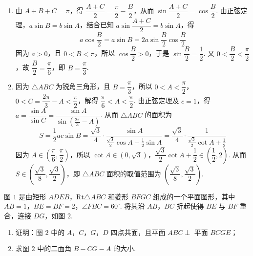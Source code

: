 \begin{solution}
\begin{enumerate}
\item 由 \(A+B+C=\pi\)，得 \(\dfrac{A+C}{2}=\dfrac\pi2-\dfrac B2\)，从而 \(\sin\dfrac{A+C}{2}=\cos\dfrac B2\). 由正弦定理，\(a\sin B=b\sin A\)，结合已知 \(a\sin\dfrac{A+C}{2}=b\sin A\)，得
\[
a\cos\frac B2=a\sin B=2a\sin\frac B2\cos\frac B2
\]
因为 \(a>0\)，且 \(0<B<\pi\)，所以 \(\cos\dfrac B2>0\)，于是 \(\sin\dfrac B2=\dfrac12\). 又 \(0<\dfrac B2<\dfrac\pi2\)，故 \(\dfrac B2=\dfrac\pi6\)，即 \(B=\dfrac\pi3\).

\item 因为 \(\triangle ABC\) 为锐角三角形，且 \(B=\dfrac\pi3\)，所以 \(0<A<\dfrac\pi2\)，\(0<C=\dfrac{2\pi}{3}-A<\dfrac\pi2\)，解得 \(\dfrac\pi6<A<\dfrac\pi2\). 由正弦定理及 \(c=1\)，得 \(a=\dfrac{\sin A}{\sin C}=\dfrac{\sin A}{\sin(\frac{2\pi}{3}-A)}\). 从而 \(\triangle ABC\) 的面积为
\[
S=\frac12ac\sin B=\frac{\sqrt3}{4}\cdot\frac{\sin A}{\frac{\sqrt3}{2}\cos A+\frac12\sin A}=\frac{\sqrt3}{4}\cdot\frac{1}{\frac{\sqrt3}{2}\cot A+\frac12}
\]
因为 \(A\in\left(\dfrac\pi6,\dfrac\pi2\right)\)，所以 \(\cot A\in(0,\sqrt3)\)，\(\dfrac{\sqrt3}{2}\cot A+\dfrac12\in\left(\dfrac12,2\right)\). 从而 \(S\in\left(\dfrac{\sqrt3}{8},\dfrac{\sqrt3}{2}\right)\)，即 \(\triangle ABC\) 面积的取值范围为 \(\left(\dfrac{\sqrt3}{8},\dfrac{\sqrt3}{2}\right)\).
\end{enumerate}
\end{solution}

\begin{problem}
图 \(1\) 是由矩形 \(ADEB\)，\(\mathrm{Rt}\triangle ABC\) 和菱形 \(BFGC\) 组成的一个平面图形，其中 \(AB=1\)，\(BE=BF=2\)，\(\angle FBC=60^\circ\). 将其沿 \(AB\)，\(BC\) 折起使得 \(BE\) 与 \(BF\) 重合，连接 \(DG\)，如图 \(2\).

\begin{enumerate}
\item 证明：图 \(2\) 中的 \(A\)，\(C\)，\(G\)，\(D\) 四点共面，且平面 \(ABC\perp\) 平面 \(BCGE\)；
\item 求图 \(2\) 中的二面角 \(B-CG-A\) 的大小.
\end{enumerate}
\end{problem}

